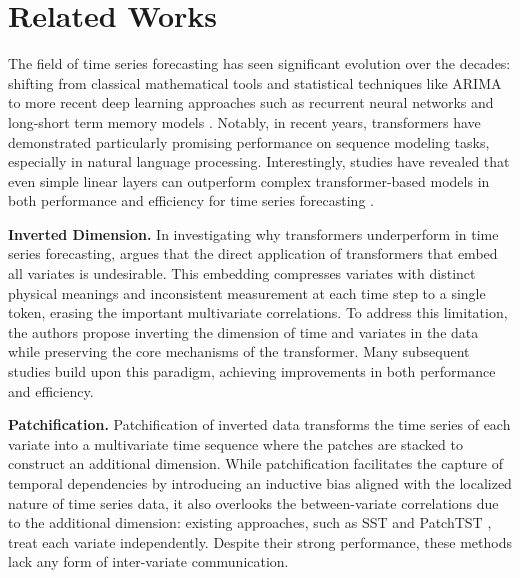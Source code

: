 \section{Related Works}
The field of time series forecasting has seen significant evolution over the decades: shifting from classical mathematical tools \citep{bloomfield2004fourier, durbin2012time} and statistical techniques like ARIMA \citep{nerlove1971time, hyndman2018forecasting} to more recent deep learning approaches such as recurrent neural networks \citep{graves2013speech} and long-short term memory models \citep{gers2000learning}. Notably, in recent years, transformers \citep{vaswani2017attention} have demonstrated particularly promising performance on sequence modeling tasks, especially in natural language processing. Interestingly, studies have revealed that even simple linear layers can outperform complex transformer-based models in both performance and efficiency for time series forecasting \citep{zeng2023transformers, yang2024neural}.

\textbf{Inverted Dimension.}
In investigating why transformers underperform in time series forecasting, \citet{liu2023itransformer} argues that the direct application of transformers that embed all variates is undesirable. This embedding compresses variates with distinct physical meanings and inconsistent measurement at each time step to a single token, erasing the important multivariate correlations. To address this limitation, the authors propose inverting the dimension of time and variates in the data while preserving the core mechanisms of the transformer. Many subsequent studies \citep{wang2025mamba, ahamed2024timemachine, xusst} build upon this paradigm, achieving improvements in both performance and efficiency. %

\textbf{Patchification.}
Patchification of inverted data transforms the time series of each variate into a multivariate time sequence where the patches are stacked to construct an additional dimension. While patchification facilitates the capture of temporal dependencies by introducing an inductive bias aligned with the localized nature of time series data, it also overlooks the between-variate correlations due to the additional dimension: existing approaches, such as SST \citep{xusst} and PatchTST \citep{nie2022time}, treat each variate independently. Despite their strong performance, these methods lack any form of inter-variate communication. 

